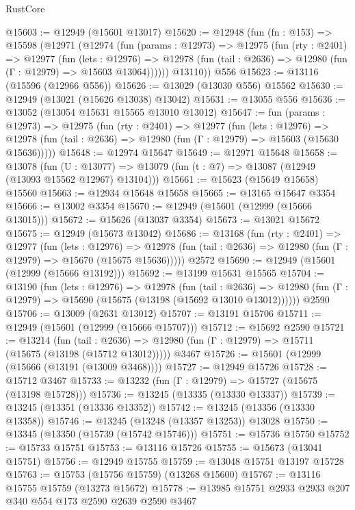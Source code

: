 \begin{lexlean}{RustCore}
\begin{coremodule}
@15603 := @12949 (@15601 @13017)
@15620 := @12948
    (fun (fn : @153) =>
    @15598
      (@12971
        (@12974
          (fun (params : @12973) =>
          @12975
            (fun (rty : @2401) =>
            @12977
              (fun (lets : @12976) =>
              @12978 (fun (tail : @2636) => @12980 (fun (Γ : @12979) => @15603 @13064))))))
        @13110))
    @556
@15623 := @13116 (@15596 (@12966 @556))
@15626 := @13029 (@13030 @556) @15562
@15630 := @12949 (@13021 (@15626 @13038) @13042)
@15631 := @13055 @556
@15636 := @13052 (@13054 @15631 @15565 @13010 @13012)
@15647 := fun (params : @12973) =>
  @12975
    (fun (rty : @2401) =>
    @12977
      (fun (lets : @12976) =>
      @12978 (fun (tail : @2636) => @12980 (fun (Γ : @12979) => @15603 (@15630 @15636)))))
@15648 := @12974 @15647
@15649 := @12971 @15648
@15658 := @13078
    (fun (U : @13077) => @13079 (fun (t : @7) => @13087 (@12949 (@13093 @15562 @12967) @13104)))
@15661 := @15623 (@15649 @15658) @15560
@15663 := @12934 @15648 @15658
@15665 := @13165 @15647 @3354
@15666 := @13002 @3354
@15670 := @12949 (@15601 (@12999 (@15666 @13015)))
@15672 := @15626 (@13037 @3354)
@15673 := @13021 @15672
@15675 := @12949 (@15673 @13042)
@15686 := @13168
    (fun (rty : @2401) =>
    @12977
      (fun (lets : @12976) =>
      @12978 (fun (tail : @2636) => @12980 (fun (Γ : @12979) => @15670 (@15675 @15636)))))
    @2572
@15690 := @12949 (@15601 (@12999 (@15666 @13192)))
@15692 := @13199 @15631 @15565
@15704 := @13190
    (fun (lets : @12976) =>
    @12978
      (fun (tail : @2636) =>
      @12980 (fun (Γ : @12979) => @15690 (@15675 (@13198 (@15692 @13010 @13012))))))
    @2590
@15706 := @13009 (@2631 @13012)
@15707 := @13191 @15706
@15711 := @12949 (@15601 (@12999 (@15666 @15707)))
@15712 := @15692 @2590
@15721 := @13214
    (fun (tail : @2636) => @12980 (fun (Γ : @12979) => @15711 (@15675 (@13198 (@15712 @13012)))))
    @3467
@15726 := @15601 (@12999 (@15666 (@13191 (@13009 @3468))))
@15727 := @12949 @15726
@15728 := @15712 @3467
@15733 := @13232 (fun (Γ : @12979) => @15727 (@15675 (@13198 @15728)))
@15736 := @13245 (@13335 (@13330 @13337))
@15739 := @13245 (@13351 (@13336 @13352))
@15742 := @13245 (@13356 (@13330 @13358))
@15746 := @13245 (@13248 (@13357 @13253)) @13028
@15750 := @13345 (@13350 (@15739 (@15742 @15746)))
@15751 := @15736 @15750
@15752 := @15733 @15751
@15753 := @13116 @15726
@15755 := @15673 (@13041 @15751)
@15756 := @12949 @15755
@15759 := @13048 @15751 @13197 @15728
@15763 := @15753 (@15756 @15759) (@13268 @15600)
@15767 := @13116 @15755 @15759 (@13273 @15672)
@15778 := @13985 @15751 @2933 @2933 @207 @340 @554 @173 @2590 @2639 @2590 @3467

\end{coremodule}
\end{lexlean}
